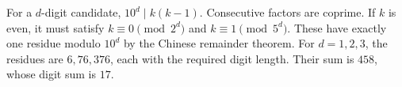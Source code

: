 For a $d$-digit candidate, $10^d\mid k(k-1)$. Consecutive factors are coprime. If $k$ is even, it must satisfy $k\equiv0\pmod{2^d}$ and $k\equiv1\pmod{5^d}$. These have exactly one residue modulo $10^d$ by the Chinese remainder theorem. For $d=1,2,3$, the residues are $6,76,376$, each with the required digit length. Their sum is $458$, whose digit sum is $\boxed{17}$.
